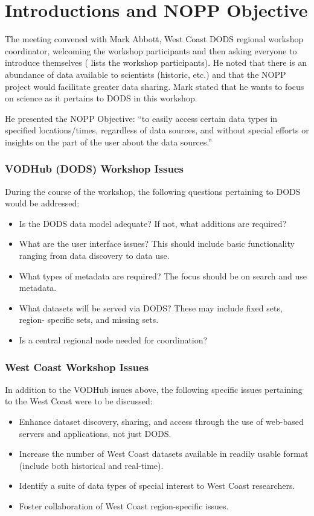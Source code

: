 \section{Introductions and NOPP Objective}

The meeting convened with Mark Abbott, West Coast DODS regional
workshop coordinator, welcoming the workshop participants and then
asking everyone to introduce themselves (
lists the workshop participants).  He noted that there is an abundance
of data available to scientists (historic, etc.) and that the NOPP
project would facilitate greater data sharing.  Mark stated that he
wants to focus on science as it pertains to DODS in this workshop.

He presented the NOPP Objective: ``to easily access certain data types
in specified locations/times, regardless of data sources, and without
special efforts or insights on the part of the user about the data
sources.''

\subsubsection{VODHub (DODS) Workshop Issues}

During the course of the workshop, the following questions pertaining
to DODS would be addressed:
\begin{itemize}
\item Is the DODS data model adequate?  If not, what additions are
  required?
\item What are the user interface issues?  This should include basic
  functionality ranging from data discovery to data use.
\item What types of metadata are required?  The focus should be on
  search and use metadata.
\item What datasets will be served via DODS?  These may include fixed
  sets, region- specific sets, and missing sets.
\item Is a central regional node needed for coordination?
\end{itemize}

\subsubsection{West Coast Workshop Issues}

In addition to the VODHub issues above, the following specific issues
pertaining to the West Coast were to be discussed:
\begin{itemize}
\item Enhance dataset discovery, sharing, and access through the use
  of web-based servers and applications, not just DODS.
\item Increase the number of West Coast datasets available in readily
  usable format (include both historical and real-time).
\item Identify a suite of data types of special interest to West Coast
  researchers.
\item Foster collaboration of West Coast region-specific issues.
\end{itemize}

